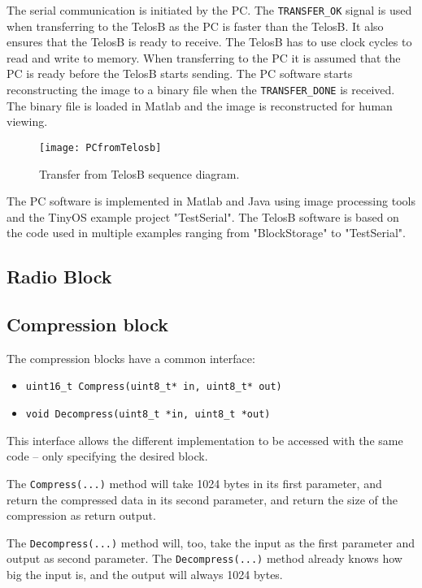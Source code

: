 The serial communication is initiated by the PC. 
The \texttt{TRANSFER\_OK} signal is used when transferring to the TelosB as the PC is faster than the TelosB. 
It also ensures that the TelosB is ready to receive. 
The TelosB has to use clock cycles to read and write to memory. 
When transferring to the PC it is assumed that the PC is ready before the TelosB starts sending. 
The PC software starts reconstructing the image to a binary file when the \texttt{TRANSFER\_DONE} is received. 
The binary file is loaded in Matlab and the image is reconstructed for human viewing.
\begin{figure}[H]
	\centering
	\texttt{[image: PCfromTelosb]}
	\caption{Transfer from TelosB sequence diagram.}
	\label{transferfromtelos}
\end{figure}
The PC software is implemented in Matlab and Java using image processing tools and the TinyOS example project "TestSerial". 
The TelosB software is based on the code used in multiple examples ranging from "BlockStorage" to "TestSerial". 



\subsection{Radio Block}
\label{sec:Radio-Block}





\subsection{Compression block}
\label{sec:Compression-block}

The compression blocks have a common interface: 

\begin{itemize}
    \item \texttt{uint16\_t Compress(uint8\_t* in, uint8\_t* out)}
    \item \texttt{void Decompress(uint8\_t *in, uint8\_t *out)}
\end{itemize}

This interface allows the different implementation to be accessed with the same code -- only specifying the desired block.

The \texttt{Compress(...)} method will take 1024 bytes in its first parameter, and return the compressed data in its second parameter, and return the size of the compression as return output.

The \texttt{Decompress(...)} method will, too, take the input as the first parameter and output as second parameter. 
The \texttt{Decompress(...)} method already knows how big the input is, and the output will always 1024 bytes.

